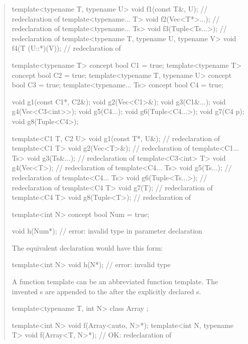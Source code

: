 \begin{quote}
\begin{codeblock}
template<typename T, typename U> void f1(const T&, U);             // redeclaration of 
template<typename... T> void f2(Vec<T*>...);                       // redeclaration of 
template<typename... Ts> void f3(Tuple<Ts...>);                    // redeclaration of 
template<typename T, typename U, typename V> void f4(T (U::*)(V)); // redeclaration of 

template<typename T> concept bool C1 = true;
template<typename T> concept bool C2 = true;
template<typename T, typename U> concept bool C3 = true;
template<typename... Ts> concept bool C4 = true;

void g1(const C1*, C2&);
void g2(Vec<C1>&);
void g3(C1&...);
void g4(Vec<C3<int>>);
void g5(C4...);
void g6(Tuple<C4...>);
void g7(C4 p);
void g8(Tuple<C4>);

template<C1 T, C2 U> void g1(const T*, U&); // redeclaration of 
template<C1 T> void g2(Vec<T>&);            // redeclaration of 
template<C1... Ts> void g3(Ts&...);         // redeclaration of 
template<C3<int> T> void g4(Vec<T>);        // redeclaration of 
template<C4... Ts> void g5(Ts...);          // redeclaration of 
template<C4... Ts> void g6(Tuple<Ts...>);   // redeclaration of 
template<C4 T> void g7(T);                  // redeclaration of 
template<C4 T> void g8(Tuple<T>);           // redeclaration of 
\end{codeblock}
\exitexample
% 
\enterexample
\begin{codeblock}
template<int N> concept bool Num = true;

void h(Num*); // error: invalid type in parameter declaration
\end{codeblock}
The equivalent declaration would have this form:
\begin{codeblock}
template<int N> void h(N*); // error: invalid type
\end{codeblock}
\exitexample

\pnum
A function template can be an abbreviated function template. The 
invented s are appended to the 
 after the explicitly declared 
s.

\enterexample
\begin{codeblock}
template<typename T, int N> class Array { };

template<int N> void f(Array<auto, N>*);
template<int N, typename T> void f(Array<T, N>*); // OK: redeclaration of 
\end{codeblock}
\exitexample


\end{quote}
